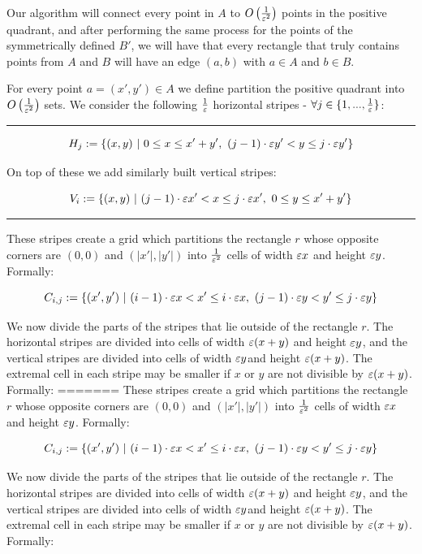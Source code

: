 \documentclass[12pt]{article}%
\begin{document}
Our algorithm will connect every point in $A$ to $O\left(\frac{1}{\varepsilon^2}\right)$ points in the positive quadrant, and after performing the same process for the points of the symmetrically defined $B'$, we will have that every rectangle that truly contains points from $A$ and $B$ will have an edge $(a,b)$ with $a\in A$ and $b\in B$.

For every point $a = (x',y') \in A$ we define partition the positive quadrant into $O\left(\frac{1}{\varepsilon^2}\right)$ sets. We consider the following $\frac{1}{\varepsilon}$ horizontal stripes - $\forall j\in \{1,...,\frac{1}{\varepsilon}\}$:

\hrule

$$H_{j}:=\{(x,y)~|~  0 \leq x \leq x'+y'  ,~ (j-1)\cdot \varepsilon y' < y \leq j\cdot \varepsilon y'\}$$

On top of these we add similarly built vertical stripes:

$$V_{i}:=\{(x,y)~|~ (j-1)\cdot \varepsilon x' < x \leq j\cdot \varepsilon x',~ 0 \leq y \leq x'+y' \}$$

\hrule

These stripes create a grid which partitions the rectangle $r$ whose
opposite corners are $(0,0)$ and $(|x'|,|y'|)$ into $\frac{1}{\varepsilon^2}$
cells of width $\varepsilon x$ and height $\varepsilon y$. Formally:

$$C_{i,j}:=\{(x',y')~|~  (i-1)\cdot \varepsilon x < x' \leq i\cdot \varepsilon x,~ (j-1)\cdot \varepsilon y< y' \leq j\cdot \varepsilon y\}$$

We now divide the parts of the stripes that lie outside of the
rectangle $r$. The horizontal stripes are divided into cells of width
$\varepsilon(x+y)$ and height $\varepsilon y$, and the vertical stripes are divided
into cells of width $\varepsilon y$and height $\varepsilon(x+y)$. The extremal cell
in each stripe may be smaller if $x$ or $y$ are not divisible by
$\varepsilon(x+y)$. Formally:
=======
These stripes create a grid which partitions the rectangle $r$ whose opposite corners are $(0,0)$ and $(|x'|,|y'|)$ into $\frac{1}{\varepsilon^2}$ cells of width $\varepsilon x$ and height $\varepsilon y$. Formally:

$$C_{i,j}:=\{(x',y')~|~  (i-1)\cdot \varepsilon x < x' \leq i\cdot \varepsilon x,~ (j-1)\cdot \varepsilon y< y' \leq j\cdot \varepsilon y\}$$

We now divide the parts of the stripes that lie outside of the rectangle $r$. The horizontal stripes are divided into cells of width $\varepsilon(x+y)$ and height $\varepsilon y$, and the vertical stripes are divided into cells of width $\varepsilon y$and height $\varepsilon(x+y)$. The extremal cell in each stripe may be smaller if $x$ or $y$ are not divisible by $\varepsilon(x+y)$. Formally:
\end{document}
